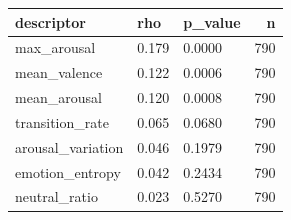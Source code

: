 \begin{tabular}{lllr}
\toprule
descriptor & rho & p\_value & n \\
\midrule
max\_arousal & 0.179 & 0.0000 & 790 \\
mean\_valence & 0.122 & 0.0006 & 790 \\
mean\_arousal & 0.120 & 0.0008 & 790 \\
transition\_rate & 0.065 & 0.0680 & 790 \\
arousal\_variation & 0.046 & 0.1979 & 790 \\
emotion\_entropy & 0.042 & 0.2434 & 790 \\
neutral\_ratio & 0.023 & 0.5270 & 790 \\
\bottomrule
\end{tabular}
